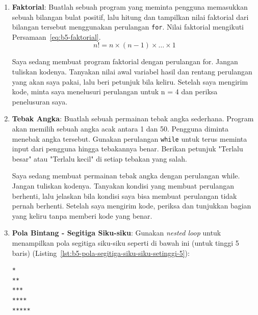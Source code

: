 \begin{enumerate}
    \item \textbf{Faktorial}: Buatlah sebuah program yang meminta pengguna memasukkan sebuah bilangan bulat positif, lalu hitung dan tampilkan nilai faktorial dari bilangan tersebut menggunakan perulangan \texttt{for}. Nilai faktorial mengikuti Persamaan~\eqref{eq:b5-faktorial}.
    \begin{equation}
      n! = n \times (n-1) \times \dots \times 1
      \label{eq:b5-faktorial}
    \end{equation}
    
      \begin{promptterarah}
      Saya sedang membuat program faktorial dengan perulangan for. Jangan tuliskan kodenya. Tanyakan nilai awal variabel hasil dan rentang perulangan yang akan saya pakai, lalu beri petunjuk bila keliru. Setelah saya mengirim kode, minta saya menelusuri perulangan untuk n = 4 dan periksa penelusuran saya.
      \end{promptterarah}
    \item \textbf{Tebak Angka}: Buatlah sebuah permainan tebak angka sederhana. Program akan memilih sebuah angka acak antara 1 dan 50. Pengguna diminta menebak angka tersebut. Gunakan perulangan \texttt{while} untuk terus meminta input dari pengguna hingga tebakannya benar. Berikan petunjuk "Terlalu besar" atau "Terlalu kecil" di setiap tebakan yang salah.
    
      \begin{promptterarah}
      Saya sedang membuat permainan tebak angka dengan perulangan while. Jangan tuliskan kodenya. Tanyakan kondisi yang membuat perulangan berhenti, lalu jelaskan bila kondisi saya bisa membuat perulangan tidak pernah berhenti. Setelah saya mengirim kode, periksa dan tunjukkan bagian yang keliru tanpa memberi kode yang benar.
      \end{promptterarah}
    \item \textbf{Pola Bintang - Segitiga Siku-siku}: Gunakan \textit{nested loop} untuk menampilkan pola segitiga siku-siku seperti di bawah ini (untuk tinggi 5 baris) (Listing~\ref{lst:b5-pola-segitiga-siku-siku-setinggi-5}):
\begin{lstlisting}[language=bash, caption={Pola segitiga siku-siku setinggi 5 baris}, label={lst:b5-pola-segitiga-siku-siku-setinggi-5}]
*
**
***
****
*****
\end{lstlisting}


\end{enumerate}
